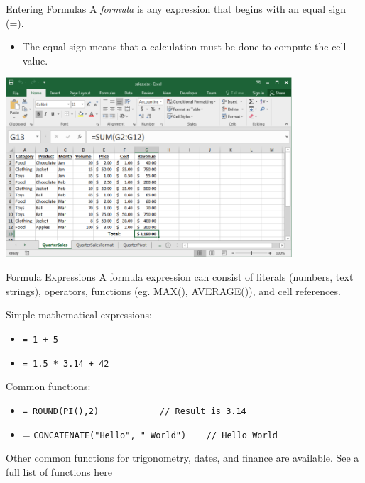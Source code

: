 \documentclass[xcolor=svgnames]{beamer}
\begin{document}
\begin{frame}{Entering Formulas}
A \emph{formula} is any expression that begins with an equal sign (=).
\begin{itemize}
\item The equal sign means that a calculation must be done to compute the cell value.
\end{itemize}
\begin{center}
 \includegraphics[width=0.8\textwidth]{formula}
\end{center}                                         
\end{frame}

\begin{frame}[fragile]{Formula Expressions}
A formula expression can consist of literals (numbers, text strings), operators, functions (eg. MAX(), AVERAGE()), and cell references.\par \vspace{3mm}  
Simple mathematical expressions:
\begin{itemize}
\item {\tt = 1 + 5}
\item {\tt = 1.5 * 3.14 + 42}
\end{itemize}
Common functions: 
\begin{itemize}
\item  \verb|= ROUND(PI(),2)			// Result is 3.14|
\item = \verb|CONCATENATE("Hello", " World")	// Hello World|
\end{itemize}
Other common functions for trigonometry, dates, and finance are available. See a full list of functions \href{https://support.office.com/en-us/article/excel-functions-alphabetical-b3944572-255d-4efb-bb96-c6d90033e188}{here}
\end{frame}
\end{document}
